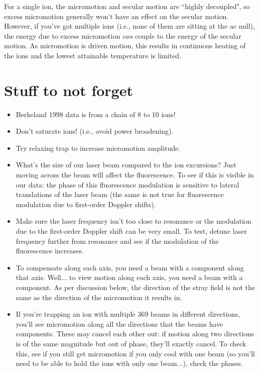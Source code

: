 \documentclass{article}
\begin{document}
For a single ion, the micromotion and secular motion are ``highly decoupled", so excess micromotion generally won't have an effect on the secular motion. However, if you've got multiple ions (i.e., none of them are sitting at the ac null), the energy due to excess micromotion \textit{can} couple to the energy of the secular motion. As micromotion is driven motion, this results in continuous heating of the ions and the lowest attainable temperature is limited.



\newpage

\section{Stuff to not forget}

\begin{itemize}
\item Berkeland 1998 data is from a chain of 8 to 10 ions! 

\item Don't saturate ions! (i.e., avoid power broadening). 

\item Try relaxing trap to increase micromotion amplitude.

\item What's the size of our laser beam compared to the ion excursions? Just moving across the beam will affect the fluorescence. To see if this is visible in our data: the phase of this fluorescence modulation is sensitive to lateral translations of the laser beam (the same is not true for fluorescence modulation due to first-order Doppler shifts).

\item Make sure the laser frequency isn't too close to resonance or the modulation due to the first-order Doppler shift can be very small. To test, detune laser frequency further from resonance and see if the modulation of the fluorescence increases.

\item To compensate along each axis, you need a beam with a component along that axis. Well... to view motion along each axis, you need a beam with a component. As per discussion below, the direction of the stray field is not the same as the direction of the micromotion it results in.

\item If you're trapping an ion with multiple 369 beams in different directions, you'll see micromotion along all the directions that the beams have components. These may cancel each other out: if motion along two directions is of the same magnitude but out of phase, they'll exactly cancel. To check this, see if you still get micromotion if you only cool with one beam (so you'll need to be able to hold the ions with only one beam...), check the phases.


\end{itemize}
\end{document}
